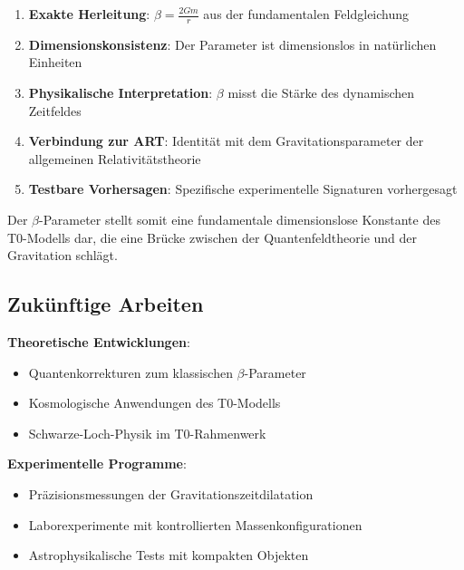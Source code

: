 \documentclass[12pt,a4paper]{article}
\begin{document}
	\begin{tcolorbox}[colback=green!5!white,colframe=green!75!black,title=Hauptergebnisse]
		\begin{enumerate}
			\item \textbf{Exakte Herleitung}: $\beta = \frac{2Gm}{r}$ aus der fundamentalen Feldgleichung
			\item \textbf{Dimensionskonsistenz}: Der Parameter ist dimensionslos in natürlichen Einheiten
			\item \textbf{Physikalische Interpretation}: $\beta$ misst die Stärke des dynamischen Zeitfeldes
			\item \textbf{Verbindung zur ART}: Identität mit dem Gravitationsparameter der allgemeinen Relativitätstheorie
			\item \textbf{Testbare Vorhersagen}: Spezifische experimentelle Signaturen vorhergesagt
		\end{enumerate}
	\end{tcolorbox}
	
	Der $\beta$-Parameter stellt somit eine fundamentale dimensionslose Konstante des T0-Modells dar, die eine Brücke zwischen der Quantenfeldtheorie und der Gravitation schlägt.
	
	\subsection{Zukünftige Arbeiten}
	\label{subsec:future_work}
	
	\textbf{Theoretische Entwicklungen}:
	\begin{itemize}
		\item Quantenkorrekturen zum klassischen $\beta$-Parameter
		\item Kosmologische Anwendungen des T0-Modells
		\item Schwarze-Loch-Physik im T0-Rahmenwerk
	\end{itemize}
	
	\textbf{Experimentelle Programme}:
	\begin{itemize}
		\item Präzisionsmessungen der Gravitationszeitdilatation
		\item Laborexperimente mit kontrollierten Massenkonfigurationen
		\item Astrophysikalische Tests mit kompakten Objekten
	\end{itemize}
	
\end{document}
